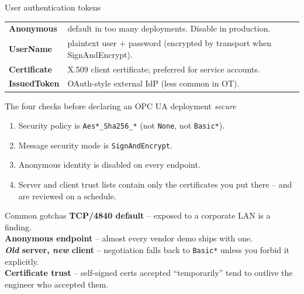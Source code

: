 \documentclass[10pt,a4paper,landscape]{article}
\begin{document}
\begin{minipage}[t]{0.49\linewidth}
\begin{panel}{User authentication tokens}
\small
\begin{tabular}{p{2.6cm} p{8.3cm}}
\textbf{Anonymous}    & default in too many deployments. Disable in production. \\
\textbf{UserName}     & plaintext user + password (encrypted by transport when SignAndEncrypt). \\
\textbf{Certificate}  & X.509 client certificate; preferred for service accounts. \\
\textbf{IssuedToken}  & OAuth-style external IdP (less common in OT). \\
\end{tabular}
\end{panel}

\vspace{2mm}
\begin{panel}{The four checks before declaring an OPC UA deployment \emph{secure}}
\small
\begin{enumerate}\setlength{\itemsep}{0pt}
  \item Security policy is \texttt{Aes*\_Sha256\_*} (not \texttt{None}, not \texttt{Basic*}).
  \item Message security mode is \texttt{SignAndEncrypt}.
  \item Anonymous identity is disabled on every endpoint.
  \item Server and client trust lists contain only the certificates you put there -- and are reviewed on a schedule.
\end{enumerate}
\end{panel}

\vspace{2mm}
\begin{panel}{Common gotchas}
\small
\textbf{TCP/4840 default} -- exposed to a corporate LAN is a finding.\\
\textbf{Anonymous endpoint} -- almost every vendor demo ships with one.\\
\textbf{\emph{Old} server, \emph{new} client} -- negotiation falls back to \texttt{Basic*} unless you forbid it explicitly.\\
\textbf{Certificate trust} -- self-signed certs accepted ``temporarily'' tend to outlive the engineer who accepted them.
\end{panel}
\end{minipage}

\clearpage
\end{document}
